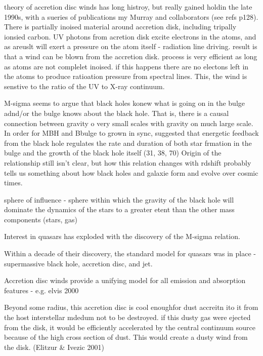theory of accretion disc winds has long histroy, but really gained holdin the late 1990s, with a sueries of publications my Murray and collaborators (see refs p128). There is partially inoised material around accretion disk, including tripally ionsied carbon. UV photons from acretion disk excite electrons in the atoms, and as areuslt will exert a pressure on the atom itself - radiation line driving.  result is that a wind can be blown from the accretion disk. process is very efficient as long as atoms are not complelet inoised. if this happens there are no electons left in the atoms to produce ratioation pressure from spectral lines. This, the wind is senstive to the ratio of the UV to X-ray continuum. 


M-sigma seems to argue that black holes konew what is going on in the bulge adnd/or the bulge knows about the black hole. 
That is, there is a causal connection between gravity o very small scales with gravity on much large scale. 
In order for MBH and Bbulge to grown in sync, suggested that energetic feedback from the black hole regulates the rate and duration of both star frmation in the bulge and the growth of the black hole itself (31, 38, 70)
Origin of the relationship still isn't clear, but how this relation changes with rdshift probably tells us something about how black holes and galaxie form and evolve over cosmic times. 

sphere of influence - sphere within which the gravity of the black hole will dominate the dynamics of the stars to a greater etent than the other mass components (stars, gas)

Interest in quasars has exploded with the discovery of the M-sigma relation. 

Within a decade of their discovery, the standard model for quasars was in place  - supermassive black hole, accretion disc, and jet. 

Accretion disc winds provide a unifying model for all emission and absorption features - e.g. elvis 2000

Beyond some radius, this accretion disc is cool enoughfor dust accreitn ito it from the host interstellar mdedum not to be destroyed. if this dusty gas were ejected from the disk, it would be efficiently accelerated by the central continuum source because of the high cross section of dust. This would create a dusty wind from the disk. 
(Elitzur \& Ivezic 2001)

